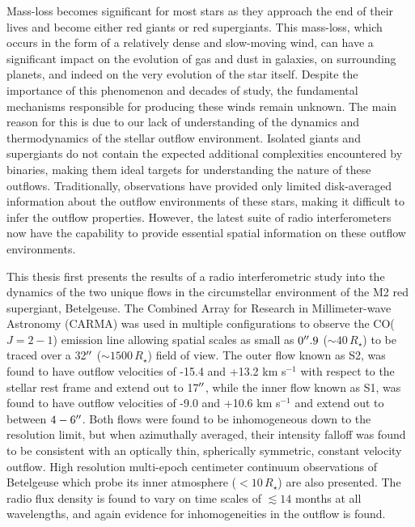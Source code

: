 
\begin{abstracts} 
\vspace{-0.5cm}
Mass-loss becomes significant for most stars as they approach the end of their lives and become either red giants or red supergiants. This mass-loss, which occurs in the form of a relatively dense and slow-moving wind, can have a significant impact on the evolution of gas and dust in galaxies, on surrounding planets, and indeed on the very evolution of the star itself.  Despite the importance of this phenomenon and decades of study,
the fundamental mechanisms responsible for producing these winds remain unknown. The main reason for this is due to our lack of understanding of the dynamics and thermodynamics of the stellar outflow environment. Isolated giants and supergiants do not contain the expected additional complexities encountered by binaries, making them ideal targets for understanding the nature of these outflows. Traditionally, observations have provided only limited disk-averaged information about the outflow environments of these stars, making it difficult to infer the outflow properties. However, the latest suite of radio interferometers now have the capability to provide essential spatial information on these outflow environments.

This thesis first presents the results of a radio interferometric study into the dynamics of the two unique flows in the circumstellar environment of the  M2 red supergiant, Betelgeuse. The  Combined Array for Research in Millimeter-wave Astronomy (CARMA) was used in multiple configurations to observe the CO($J=2-1$) emission line allowing  spatial scales as small as $0^{\prime\prime} .9$ ($\sim 40\,R_{\star}$) to be traced over a 32$^{\prime\prime}$ ($\sim 1500\,R_{\star}$) field of view. The outer flow known as S2, was found to have outflow velocities of -15.4 and +13.2 km s$^{-1}$ with respect to the stellar rest frame and extend out to 17$^{\prime\prime}$, while the inner flow known as S1, was found to have outflow velocities of -9.0 and +10.6 km s$^{-1}$ and extend out to between $4 - 6^{\prime\prime}$. Both flows were found to be inhomogeneous down to the resolution limit, but when azimuthally averaged, their intensity falloff was found to be consistent with an optically thin, spherically symmetric, constant velocity outflow. High resolution multi-epoch centimeter continuum observations of Betelgeuse which probe its inner atmosphere ($< 10\,R_{\star}$) are also presented. The radio flux density is found to vary on time scales of $\lesssim 14$ months at all wavelengths, and again evidence for inhomogeneities in the outflow is found.


\end{abstracts}
